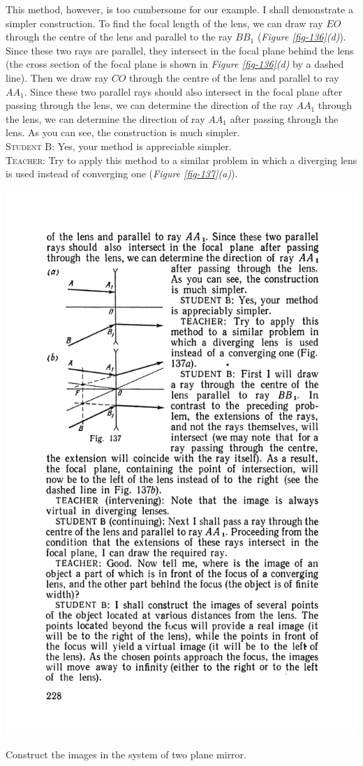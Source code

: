 \documentclass[a4paper,sfsidenotes]{tufte-book}
\begin{document}
This method, however, is too cumbersome for our example. I shall demonstrate a simpler construction. To find the focal length of the lens, we can draw ray $EO$ through the centre of the lens and parallel to the ray $BB_{1}$ (\emph{Figure \ref{fig-136}(d)}). Since these two rays are parallel, they intersect in the focal plane behind the lens (the cross section of the focal plane is shown in \emph{Figure \ref{fig-136}(d)} by a dashed line). Then we draw ray $CO$ through the centre of the lens and parallel to ray $AA_{1}$. Since these two parallel rays should also intersect in the focal plane after passing through the lens, we can determine the direction of the ray $AA_{1}$ through the lens, we can determine the direction of ray $AA_{1}$ after passing through the lens. As you can see, the construction is much simpler. 
\\
\textsc{Student B:} Yes, your method is appreciable simpler. 
\\
\textsc{Teacher:} Try to apply this method to a similar problem in which a diverging lens is used instead of converging one (\emph{Figure \ref{fig-137}(a)}).
\begin{marginfigure}%
\includegraphics[width=\linewidth]{fig-137a}
\caption{Construct the images in the system of two plane mirror.}
\label{fig-137}
\end{marginfigure}
\end{document}
